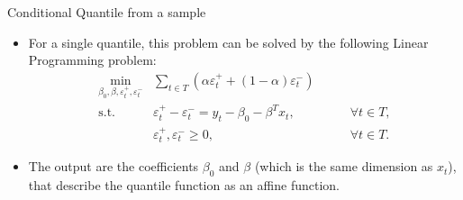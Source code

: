 \documentclass[11pt]{beamer}
\begin{document}
\begin{frame}{Conditional Quantile from a sample}

\begin{itemize}

\item
For a single quantile, this problem can be solved by the following
Linear Programming problem: \[
\begin{array}{lll}
\underset{\beta_0, \beta,\varepsilon_{t}^{+}, \varepsilon_{t}^{-}}{\text{min}} & \sum_{t \in T} \left(\alpha \varepsilon_{t}^{+}+(1-\alpha)\varepsilon_{t}^{-}\right) & \\
\mbox{s.t. } & \varepsilon_{t}^{+}-\varepsilon_{t}^{-}=y_{t} - \beta_{0} - \beta^T x_{t}, & \qquad\forall t \in T,\\
& \varepsilon_t^+,\varepsilon_t^- \geq 0, & \qquad \forall t \in T.
\end{array}
\]
\item
The output are the coefficients \(\beta_0\) and \(\beta\) (which is
the same dimension as \(x_t\)), that describe the quantile function as
an affine function.
\end{itemize}

\end{frame}
\end{document}
